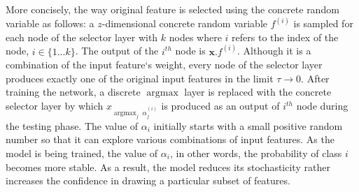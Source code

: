 \documentclass{bioinfo}
\DeclareMathOperator*{\argmax}{argmax}
\begin{document}
More concisely, the way original feature is selected using the concrete random variable as follows: a $z$-dimensional concrete random variable $f^{(i)}$ is sampled for each node of the selector layer with $k$ nodes where $i$ refers to the index of the node, $i \in \{1...k\}$. The output of the $i^{th}$ node is $ \textbf{x}.f^{(i)}$. Although it is a combination of the input feature`s weight, every node of the selector layer produces exactly one of the original input features in the limit $\tau \to 0$. After training the network, a discrete $\argmax$ layer is replaced with the concrete selector layer by which $x_{\argmax_j \; \alpha_j^{(i)}}$ is produced as an output of $i^{th}$ node during the testing phase. The value of $\alpha_i$ initially starts with a small positive random number so that it can explore various combinations of input features. As the model is being trained, the value of $\alpha_i$, in other words, the probability of class $i$ becomes more stable. As a result, the model reduces its stochasticity rather increases the confidence in drawing a particular subset of features. 
\end{document}
